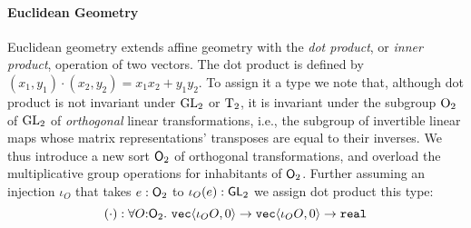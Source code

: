 \paragraph{Euclidean Geometry} Euclidean geometry extends affine
geometry with the \emph{dot product}, or \emph{inner product},
operation of two vectors. The dot product is defined 
by
$  (x_1,y_1) \cdot (x_2,y_2) = x_1x_2 + y_1y_2$.
To %
assign it a type we note that, although dot product is not
invariant under $\mathrm{GL}_2$ or $\mathrm{T}_2$, it
is invariant under the subgroup $\mathrm{O}_2$ of $\mathrm{GL}_2$ of
\emph{orthogonal} linear transformations, i.e., the subgroup of
invertible linear maps whose matrix representations' transposes are
equal to their inverses. We thus introduce a new sort $\mathsf{O}_2$ of
orthogonal transformations, and overload the multiplicative group
operations for inhabitants of $\mathsf{O}_2$. Further assuming an
injection $\iota_O$ that takes $e : \mathsf{O}_2$ to $\iota_O(e) :
\mathsf{GL}_2$ we assign dot product this type:
\begin{displaymath}
  (\cdot) : \forall O \mathord: \SynOrth{2}.\ \tyPrim{vec}{\iota_OO, 0} \to \tyPrim{vec}{\iota_OO, 0} \to \tyPrimNm{real}
\end{displaymath}

